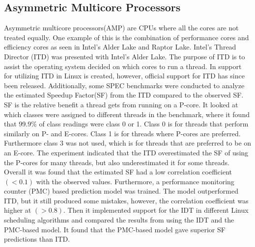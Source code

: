 \subsection{Asymmetric Multicore Processors}
Asymmetric multicore processors(AMP) are CPUs where all the cores are not treated equally. One example of this is the combination of performance cores and efficiency cores as seen in Intel's Alder Lake and Raptor Lake. Intel's Thread Director (ITD) was presented with Intel's Alder Lake. The purpose of ITD is to assist the operating system decided on which cores to run a thread.
In \cite{saez2022evaluation} support for utilizing ITD in Linux is created, however, official support for ITD has since been released. Additionally, some SPEC benchmarks were conducted to analyze the estimated Speedup Factor(SF) from the ITD compared to the observed SF. SF is the relative benefit a thread gets from running on a P-core. It looked at which classes were assigned to different threads in the benchmark, where it found that 99.9\% of class readings were class 0 or 1. Class 0 is for threads that perform similarly on P- and E-cores. Class 1 is for threads where P-cores are preferred.\cite{Intel202?whitepaper} Furthermore class 3 was not used, which is for threads that are preferred to be on an E-core. The experiment indicated that the ITD overestimated the SF of using the P-cores for many threads, but also underestimated it for some threads. Overall it was found that the estimated SF had a low correlation coefficient $(<0.1)$ with the observed values. Furthermore, a performance monitoring counter (PMC) based prediction model was trained. The model outperformed ITD, but it still produced some mistakes, however, the correlation coefficient was higher at $(>0.8)$. Then it implemented support for the IDT in different Linux scheduling algorithms and compared the results from using the IDT and the PMC-based model. It found that the PMC-based model gave superior SF predictions than ITD.\cite{saez2022evaluation}